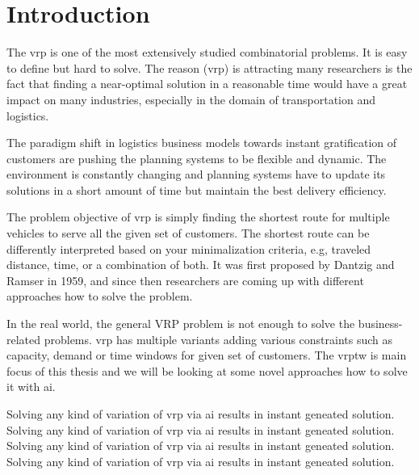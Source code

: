 \chapter{Introduction}
    The \gls{vrp} is one of the most extensively studied combinatorial problems. It is easy to define but hard to solve. The reason (\gls{vrp}) is attracting many researchers is the fact that finding a near-optimal solution in a reasonable time would have a great impact on many industries, especially in the domain of transportation and logistics. 
    
    The paradigm shift in logistics business models towards instant gratification of customers are pushing the planning systems to be flexible and dynamic. The environment is constantly changing and planning systems have to update its solutions in a short amount of time but maintain the best delivery efficiency.
    
    The problem objective of \gls{vrp} is simply finding the shortest route for multiple vehicles to serve all the given set of customers. The shortest route can be differently interpreted based on your minimalization criteria, e.g, traveled distance, time, or a combination of both. It was first proposed by Dantzig and Ramser \cite{truck-dispatching-problem} in 1959, and since then researchers are coming up with different approaches how to solve the problem. 

    In the real world, the general VRP problem is not enough to solve the business-related problems. \gls{vrp} has multiple variants adding various constraints such as capacity, demand or time windows for given set of customers. The \gls{vrptw} is main focus of this thesis and we will be looking at some novel approaches how to solve it with \gls{ai}.
    
    Solving any kind of variation of \gls{vrp} via \gls{ai} results in instant geneated solution. Solving any kind of variation of \gls{vrp} via \gls{ai} results in instant geneated solution. Solving any kind of variation of \gls{vrp} via \gls{ai} results in instant geneated solution. Solving any kind of variation of \gls{vrp} via \gls{ai} results in instant geneated solution.
    
